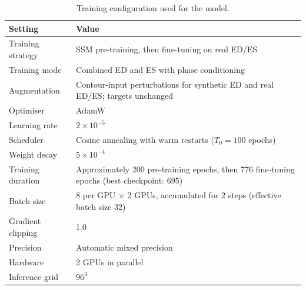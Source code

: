 \begin{table}[H]
	\centering
	\caption[Model training configuration]{Training configuration used for the
	model.}
	\label{tab:training-config}
	\thesistablestyle
	\begin{tabular*}{\textwidth}{@{\extracolsep{\fill}}p{} p{}@{}}
		\toprule
		Setting & Value \\
		\midrule
		Training strategy & SSM pre-training, then fine-tuning on real ED/ES \\
		Training mode & Combined ED and ES with phase conditioning \\
		Augmentation & Contour-input perturbations for synthetic ED and real ED/ES; targets unchanged \\
		Optimiser & AdamW \\
		Learning rate & $2\times10^{-5}$ \\
		Scheduler & Cosine annealing with warm restarts ($T_0=100$ epochs) \\
		Weight decay & $5\times10^{-4}$ \\
		Training duration & Approximately 200 pre-training epochs, then 776 fine-tuning epochs (best checkpoint: 695) \\
		Batch size & 8 per GPU $\times$ 2 GPUs, accumulated for 2 steps (effective batch size 32) \\
		Gradient clipping & 1.0 \\
		Precision & Automatic mixed precision \\
		Hardware & 2 GPUs in parallel \\
		Inference grid & $96^3$ \\
		\bottomrule
	\end{tabular*}
\end{table}

